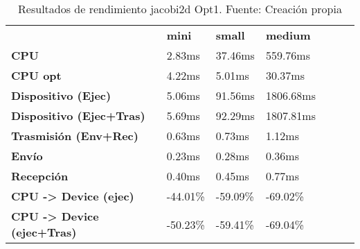 \begin{table}[H]
    \centering
    \begin{tabular}{lllllll}
    \rowcolor[HTML]{DAE8FC} \ &  \textbf{mini} &  \textbf{	small} &  \textbf{	medium} \\
    \cellcolor[HTML]{DAE8FC} \textbf{CPU} & 2.83ms & 	37.46ms & 	559.76ms \\
    \rowcolor[HTML]{EFEFEF} \cellcolor[HTML]{DAE8FC} \textbf{CPU opt} & 4.22ms & 	5.01ms & 	30.37ms \\
    \cellcolor[HTML]{DAE8FC} \textbf{Dispositivo (Ejec)} & 5.06ms & 	91.56ms & 	1806.68ms \\
    \rowcolor[HTML]{EFEFEF} \cellcolor[HTML]{DAE8FC} \textbf{Dispositivo (Ejec+Tras)} & 5.69ms & 	92.29ms & 	1807.81ms \\
    \cellcolor[HTML]{DAE8FC} \textbf{Trasmisión (Env+Rec)} & 0.63ms & 	0.73ms & 	1.12ms \\
    \rowcolor[HTML]{EFEFEF} \cellcolor[HTML]{DAE8FC} \textbf{Envío} & 0.23ms & 	0.28ms & 	0.36ms \\
    \cellcolor[HTML]{DAE8FC} \textbf{Recepción} & 0.40ms & 	0.45ms & 	0.77ms \\
    \rowcolor[HTML]{EFEFEF} \cellcolor[HTML]{DAE8FC} \textbf{CPU -> Device (ejec)} & -44.01\% & 	-59.09\% & 	-69.02\% \\
    \cellcolor[HTML]{DAE8FC} \textbf{CPU -> Device (ejec+Tras)} & -50.23\% & 	-59.41\% & 	-69.04\% \\
    \end{tabular}
    \caption[Resultados de rendimiento jacobi2d Opt1]{{Resultados de rendimiento jacobi2d Opt1. Fuente: Creación propia}}
    \label{table_test_jacobi2d_Opt1_hw_performanceResults}
\end{table}